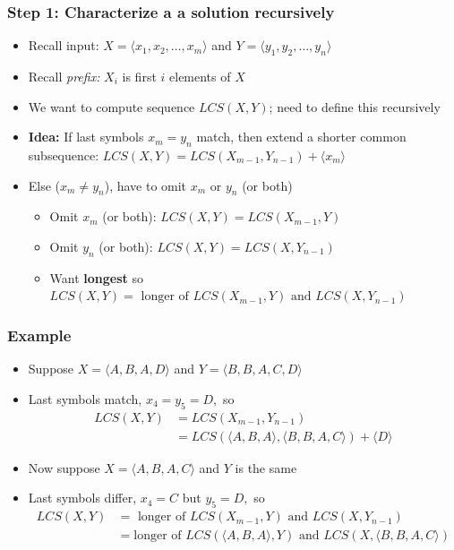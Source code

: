 \documentclass{beamer}
\begin{document}
\begin{frame} \frametitle{Step 1: Characterize a a solution recursively}
  \begin{itemize}
  \item Recall input: $X=\langle x_1, x_2, \ldots, x_m \rangle$ and $Y=\langle y_1, y_2, \ldots, y_n \rangle$
  \item Recall \emph{prefix:} $X_i$ is first $i$ elements of $X$
  \item We want to compute sequence $LCS(X, Y)$; need to define this recursively
  \item \textbf{Idea:} If last symbols $x_m=y_n$ match, then extend a shorter common subsequence:
    $LCS(X, Y) = LCS(X_{m-1}, Y_{n-1}) + \langle x_m \rangle$
  \item Else ($x_m \ne y_n$), have to omit $x_m$ or $y_n$ (or both)
    \begin{itemize}
    \item Omit $x_m$ (or both): $LCS(X, Y) = LCS(X_{m-1}, Y)$
    \item Omit $y_n$ (or both): $LCS(X, Y) = LCS(X, Y_{n-1})$
    \item Want \textbf{longest} so $LCS(X, Y) = \text{ longer of } LCS(X_{m-1}, Y) \text{ and } LCS(X, Y_{n-1})$
    \end{itemize}
  \end{itemize}
\end{frame}

\begin{frame} \frametitle{Example}
  \begin{itemize}
  \item Suppose $X=\langle A, B, A, D \rangle$ and $Y = \langle B, B, A, C, D \rangle$
  \item Last symbols match,  $x_4=y_5=D,$ so
    \begin{align*}
      LCS(X,Y) &= LCS(X_{m-1}, Y_{n-1}) \\
      &= LCS(\langle A, B, A \rangle, \langle B, B, A, C \rangle) + \langle D \rangle
    \end{align*}
  \item Now suppose $X=\langle A, B, A, C \rangle$ and $Y$ is the same
  \item Last symbols differ, $x_4=C$ but $y_5=D,$ so
    \begin{align*}
      LCS(X, Y) &= \text{ longer of } LCS(X_{m-1}, Y) \text{ and } LCS(X, Y_{n-1}) \\
      &= \text{longer of } LCS(\langle A, B, A \rangle, Y) \text{ and } LCS(X, \langle B, B, A, C \rangle)
    \end{align*}
  \end{itemize}
  
\end{frame}
\end{document}
